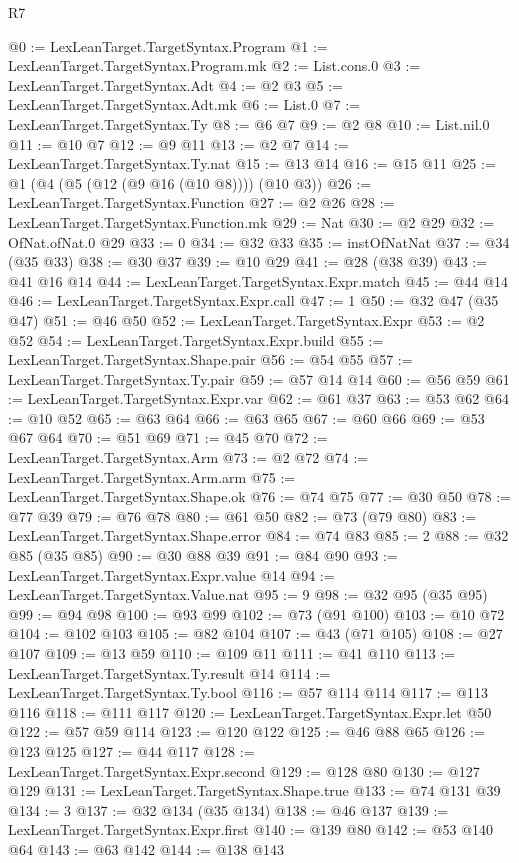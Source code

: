 \begin{lexlean}{R7}
\begin{coremodule}
@0 := LexLeanTarget.TargetSyntax.Program
@1 := LexLeanTarget.TargetSyntax.Program.mk
@2 := List.cons.{0}
@3 := LexLeanTarget.TargetSyntax.Adt
@4 := @2 @3
@5 := LexLeanTarget.TargetSyntax.Adt.mk
@6 := List.{0}
@7 := LexLeanTarget.TargetSyntax.Ty
@8 := @6 @7
@9 := @2 @8
@10 := List.nil.{0}
@11 := @10 @7
@12 := @9 @11
@13 := @2 @7
@14 := LexLeanTarget.TargetSyntax.Ty.nat
@15 := @13 @14
@16 := @15 @11
@25 := @1 (@4 (@5 (@12 (@9 @16 (@10 @8)))) (@10 @3))
@26 := LexLeanTarget.TargetSyntax.Function
@27 := @2 @26
@28 := LexLeanTarget.TargetSyntax.Function.mk
@29 := Nat
@30 := @2 @29
@32 := OfNat.ofNat.{0} @29
@33 := 0
@34 := @32 @33
@35 := instOfNatNat
@37 := @34 (@35 @33)
@38 := @30 @37
@39 := @10 @29
@41 := @28 (@38 @39)
@43 := @41 @16 @14
@44 := LexLeanTarget.TargetSyntax.Expr.match
@45 := @44 @14
@46 := LexLeanTarget.TargetSyntax.Expr.call
@47 := 1
@50 := @32 @47 (@35 @47)
@51 := @46 @50
@52 := LexLeanTarget.TargetSyntax.Expr
@53 := @2 @52
@54 := LexLeanTarget.TargetSyntax.Expr.build
@55 := LexLeanTarget.TargetSyntax.Shape.pair
@56 := @54 @55
@57 := LexLeanTarget.TargetSyntax.Ty.pair
@59 := @57 @14 @14
@60 := @56 @59
@61 := LexLeanTarget.TargetSyntax.Expr.var
@62 := @61 @37
@63 := @53 @62
@64 := @10 @52
@65 := @63 @64
@66 := @63 @65
@67 := @60 @66
@69 := @53 @67 @64
@70 := @51 @69
@71 := @45 @70
@72 := LexLeanTarget.TargetSyntax.Arm
@73 := @2 @72
@74 := LexLeanTarget.TargetSyntax.Arm.arm
@75 := LexLeanTarget.TargetSyntax.Shape.ok
@76 := @74 @75
@77 := @30 @50
@78 := @77 @39
@79 := @76 @78
@80 := @61 @50
@82 := @73 (@79 @80)
@83 := LexLeanTarget.TargetSyntax.Shape.error
@84 := @74 @83
@85 := 2
@88 := @32 @85 (@35 @85)
@90 := @30 @88 @39
@91 := @84 @90
@93 := LexLeanTarget.TargetSyntax.Expr.value @14
@94 := LexLeanTarget.TargetSyntax.Value.nat
@95 := 9
@98 := @32 @95 (@35 @95)
@99 := @94 @98
@100 := @93 @99
@102 := @73 (@91 @100)
@103 := @10 @72
@104 := @102 @103
@105 := @82 @104
@107 := @43 (@71 @105)
@108 := @27 @107
@109 := @13 @59
@110 := @109 @11
@111 := @41 @110
@113 := LexLeanTarget.TargetSyntax.Ty.result @14
@114 := LexLeanTarget.TargetSyntax.Ty.bool
@116 := @57 @114 @114
@117 := @113 @116
@118 := @111 @117
@120 := LexLeanTarget.TargetSyntax.Expr.let @50
@122 := @57 @59 @114
@123 := @120 @122
@125 := @46 @88 @65
@126 := @123 @125
@127 := @44 @117
@128 := LexLeanTarget.TargetSyntax.Expr.second
@129 := @128 @80
@130 := @127 @129
@131 := LexLeanTarget.TargetSyntax.Shape.true
@133 := @74 @131 @39
@134 := 3
@137 := @32 @134 (@35 @134)
@138 := @46 @137
@139 := LexLeanTarget.TargetSyntax.Expr.first
@140 := @139 @80
@142 := @53 @140 @64
@143 := @63 @142
@144 := @138 @143

\end{coremodule}
\end{lexlean}

